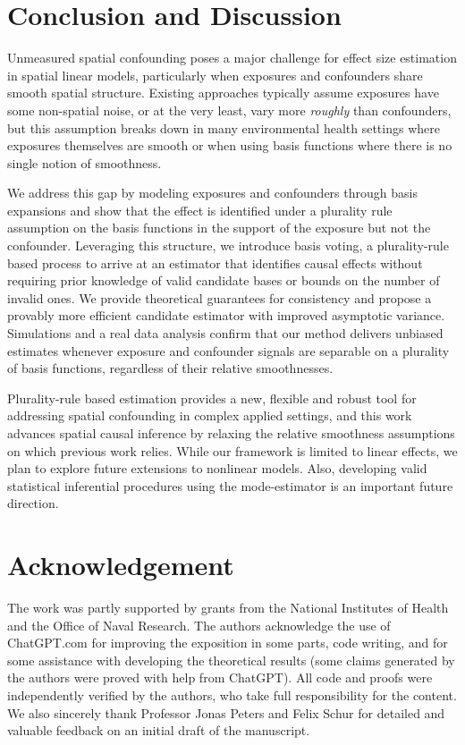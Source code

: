 \documentclass[
  12pt]{article}
\newcommand{\pink}[1]{{\leavevmode\color{magenta}{#1}}}
\begin{document}
\section{Conclusion and Discussion}\label{sec:discussion}

Unmeasured spatial confounding poses a major challenge for effect size estimation in spatial linear models, particularly when exposures and confounders share smooth spatial structure. Existing approaches typically assume exposures have some non-spatial noise, or at the very least, vary more \textit{roughly} than confounders, but this assumption breaks down in many environmental health settings where exposures themselves are smooth or when using basis functions where there is no single notion of smoothness.

We address this gap by modeling exposures and confounders through basis expansions and show that the effect is identified under a plurality rule assumption on the basis functions in the support of the exposure but not the confounder. Leveraging this structure, we introduce basis voting, a plurality-rule based process to arrive at an estimator that identifies causal effects without requiring prior knowledge of valid candidate bases or bounds on the number of invalid ones. We provide theoretical guarantees for consistency and propose a provably more efficient candidate estimator with improved asymptotic variance. Simulations and a real data analysis confirm that our method delivers unbiased estimates whenever exposure and confounder signals are separable on a plurality of basis functions, regardless of their relative smoothnesses. 

Plurality-rule based estimation provides a new, flexible and robust tool for addressing spatial confounding in complex applied settings, and this work advances spatial causal inference by relaxing the relative smoothness assumptions on which previous work relies.  While our framework is limited to linear effects, we plan to explore future extensions to nonlinear models. Also, developing valid statistical inferential procedures using the mode-estimator is an important future direction.  


\addtolength{\textheight}{-.2in}

\section{Acknowledgement} The work was partly supported by grants from the National Institutes of Health and the Office of Naval Research. %
The authors acknowledge the use of ChatGPT.com for improving the exposition in some parts, code writing, and for some assistance with developing the theoretical results (some claims generated by the authors were proved with help from ChatGPT). All code and proofs were independently verified by the authors, who take full responsibility for the content. We also sincerely thank Professor Jonas Peters and Felix Schur for detailed and valuable feedback on an initial draft of the manuscript. 
\end{document}
